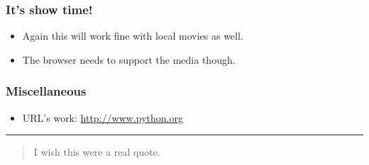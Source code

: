 \documentclass[14pt, compress]{beamer}
\begin{document}
\begin{frame}
  \frametitle{It's show time!}

  \begin{itemize}
  \item Again this will work fine with local movies as well.
  \item The browser needs to support the media though.
  \end{itemize}

\end{frame}

\begin{frame}
  \frametitle{Miscellaneous}
  \begin{itemize}
  \item URL's work: \url{http://www.python.org}
  \end{itemize}
  \hrule
  \begin{quote}
    I wish this were a real quote.
  \end{quote}
\end{frame}
\end{document}
